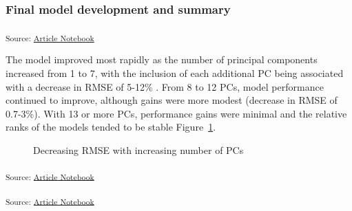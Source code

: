 \documentclass[
]{agujournal2019}
\begin{document}
\subsubsection{Final model development and
summary}\label{final-model-development-and-summary}

\textsubscript{Source:
\href{https://rvcrawford.github.io/glowing-system/index.qmd.html}{Article
Notebook}}

The model improved most rapidly as the number of principal components
increased from 1 to 7, with the inclusion of each additional PC being
associated with a decrease in RMSE of 5-12\% . From 8 to 12 PCs, model
performance continued to improve, although gains were more modest
(decrease in RMSE of 0.7-3\%). With 13 or more PCs, performance gains
were minimal and the relative ranks of the models tended to be stable
Figure~\ref{fig-model-calibration}.

\label{cell-fig-model-calibration}
\begin{figure}[H]


\caption{\label{fig-model-calibration}Decreasing RMSE with increasing
number of PCs}

\end{figure}%

\textsubscript{Source:
\href{https://rvcrawford.github.io/glowing-system/index.qmd.html}{Article
Notebook}}

\textsubscript{Source:
\href{https://rvcrawford.github.io/glowing-system/index.qmd.html}{Article
Notebook}}
\end{document}
